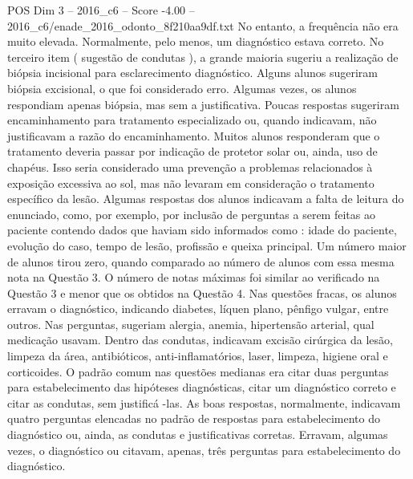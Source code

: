 \begin{textsample}{POS Dim 3 – 2016\_c6 – Score -4.00 – 2016\_c6/enade\_2016\_odonto\_8f210aa9df.txt}
No entanto, a frequência não era muito elevada.
Normalmente, pelo menos, um diagnóstico estava correto.
No terceiro item ( sugestão de condutas ), a grande maioria sugeriu a realização de biópsia incisional para esclarecimento diagnóstico.
Alguns alunos sugeriram biópsia excisional, o que foi considerado erro.
Algumas vezes, os alunos respondiam apenas biópsia, mas sem a justificativa.
Poucas respostas sugeriram encaminhamento para tratamento especializado ou, quando indicavam, não justificavam a razão do encaminhamento.
Muitos alunos responderam que o tratamento deveria passar por indicação de protetor solar ou, ainda, uso de chapéus.
Isso seria considerado uma prevenção a problemas relacionados à exposição excessiva ao sol, mas não levaram em consideração o tratamento específico da lesão.
Algumas respostas dos alunos indicavam a falta de leitura do enunciado, como, por exemplo, por inclusão de perguntas a serem feitas ao paciente contendo dados que haviam sido informados como : idade do paciente, evolução do caso, tempo de lesão, profissão e queixa principal.
Um número maior de alunos tirou zero, quando comparado ao número de alunos com essa mesma nota na Questão 3.
O número de notas máximas foi similar ao verificado na Questão 3 e menor que os obtidos na Questão 4.
Nas questões fracas, os alunos erravam o diagnóstico, indicando diabetes, líquen plano, pênfigo vulgar, entre outros.
Nas perguntas, sugeriam alergia, anemia, hipertensão arterial, qual medicação usavam.
Dentro das condutas, indicavam excisão cirúrgica da lesão, limpeza da área, antibióticos, anti-inflamatórios, laser, limpeza, higiene oral e corticoides.
O padrão comum nas questões medianas era citar duas perguntas para estabelecimento das hipóteses diagnósticas, citar um diagnóstico correto e citar as condutas, sem justificá -las.
As boas respostas, normalmente, indicavam quatro perguntas elencadas no padrão de respostas para estabelecimento do diagnóstico ou, ainda, as condutas e justificativas corretas.
Erravam, algumas vezes, o diagnóstico ou citavam, apenas, três perguntas para estabelecimento do diagnóstico.

\end{textsample}
